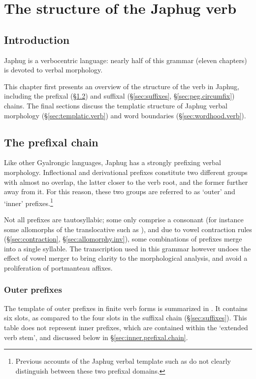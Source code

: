 \chapter{The structure of the Japhug verb} \label{chap:verb.template}

\section{Introduction} \label{sec:verb.intro}
Japhug is a verbocentric language: nearly half of this grammar (eleven chapters) is devoted to verbal morphology.  

This chapter first presents an overview of the structure of the verb in Japhug, including the prefixal (§\ref{sec:prefixal.chain}) and suffixal (§\ref{sec:suffixes}, §\ref{sec:peg.circumfix}) chains. The final sections discuss the templatic structure of Japhug verbal morphology (§\ref{sec:templatic.verb}) and word boundaries (§\ref{sec:wordhood.verb}).
 
 
\section{The prefixal chain} \label{sec:prefixal.chain}
Like other Gyalrongic languages, Japhug has a strongly prefixing verbal morphology. Inflectional and derivational prefixes constitute two different groups with almost no overlap, the latter closer to the verb root, and the former further away from it. For this reason, these two groups are referred to as `outer' and `inner' prefixes.\footnote{Previous accounts of the Japhug verbal template such as \citet{jacques13harmonization} do not clearly distinguish between these two prefixal domains.}

Not all prefixes are tautosyllabic; some only comprise a consonant (for instance some allomorphs of the translocative such as ), and due to vowel contraction rules (§\ref{sec:contraction}, §\ref{sec:allomorphy.inv}), some combinations of prefixes merge into a single syllable. The transcription used in this grammar however undoes the effect of vowel merger to bring clarity to the morphological analysis, and avoid a proliferation of portmanteau affixes.

\subsection{Outer prefixes} \label{sec:outer.prefixal.chain}
The template of outer prefixes in finite verb forms is summarized in . It contains six slots, as compared to the four slots in the suffixal chain (§\ref{sec:suffixes}). This table does not represent inner prefixes, which are contained within the `extended verb stem', and discussed below in §\ref{sec:inner.prefixal.chain}.

